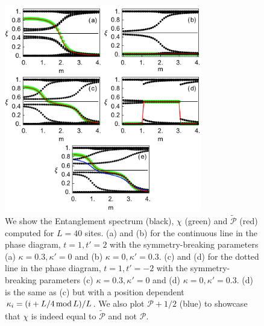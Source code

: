 \documentclass[twocolumn,amsmath,longbibliography,amssymb,superscriptaddress]{revtex4-1}
\begin{document}
\begin{figure}[t]
\centering
\includegraphics[width=86mm]{fig4comp.pdf}
\caption{We show the Entanglement spectrum (black), $\chi$ (green) and $\tilde{\mathcal{P}}$ (red) computed for $L=40$ sites. (a) and (b) for the continuous line in the phase diagram, $t=1,t'=2$  with the symmetry-breaking parameters (a) $\kappa=0.3,\kappa'=0$ and (b) $\kappa=0,\kappa'=0.3$. (c) and (d) for the dotted line in the phase diagram, $t=1,t'=-2$  with the symmetry-breaking parameters (c) $\kappa=0.3,\kappa'=0$ and (d) $\kappa=0,\kappa'=0.3$. (d) is the same as (c) but with a position dependent $\kappa_i=(i+L/4 \, {\rm mod}\, L)/L$. We also plot $\mathcal{P}+1/2$ (blue) to showcase that $\chi$ is indeed equal to $\tilde{\mathcal{P}}$ and not $\mathcal{P}$. }
	\label{2}
\end{figure}
\end{document}
